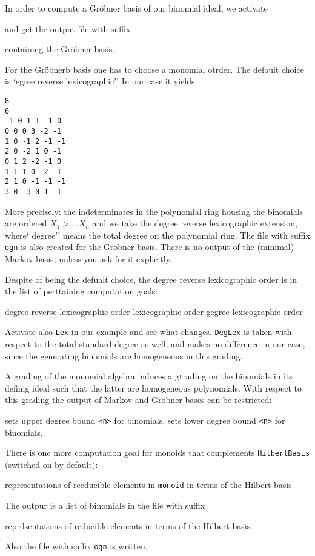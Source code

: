 In order to compute a Gröbner basis of our binomial ideal, we activate
\begin{itemize}
	\itemtt[GroebnerBasis]
\end{itemize}
and get the output file with suffix
\begin{itemize}
	\itemtt[grb] containing the Gröbner basis.
\end{itemize}
For the Gröbnerb basis one has to choose a monomial otrder. The default choice is `egree reverse lexicographic'' In our case it yields
\begin{Verbatim}
8
6
-1 0 1 1 -1 0 
0 0 0 3 -2 -1 
1 0 -1 2 -1 -1 
2 0 -2 1 0 -1 
0 1 2 -2 -1 0 
1 1 1 0 -2 -1 
2 1 0 -1 -1 -1 
3 0 -3 0 1 -1 
\end{Verbatim}
More precisely: the indeterminates in the polynomial ring housing the binomials are ordered $X_1 > \dots X_n$ and we take the degree reverse lexicographic extension, where`  degree'' means the total degree on the polynomial ring. The file with suffix \verb|ogn| is also created for the Gröbner basis. There is no output of the (minimal) Markov basis, unless you ask for it explicitly. 

Despite of being the defualt choice, the degree reverse lexicographic order is in the list of perttaining computation goals:
\begin{itemize}
	\itemtt[RevLex] degree reverse lexicographic order
	\itemtt[Lex] lexicographic order
	\itemtt[DegLex] gegree lexicographic order 
\end{itemize}
Activate also \verb|Lex| in our example and see what changes. \verb|DegLex| is taken with respect to the total standard degree as well, and makes no difference in our case, since the generating binomials are homogeneous in this grading.

A grading of the monomial algebra induces a gtrading on the binomials in its definig ideal such that the latter are homogeneous polynomials. With respect to this grading  the output of Markov and Gröbner bases can be restricted:
\begin{itemize}
	 sets upper degree bound \verb|<n>| for binomials,
	 sets lower degree bound  \verb|<n>| for binomials. 
\end{itemize}

There is one more computation goal for monoids that complements \verb|HilbertBasis| (switched on by default):
\begin{itemize}
	\itemtt[Representations] representations of reeducible elements in \verb|monoid| in terms of the Hilbert basis
\end{itemize}
The outpur is a list of binomials in the file with suffix
\begin{itemize}
	\itemtt[rep] reprdsentations of reducible elements in terms of the Hilbert basis.
\end{itemize}
Also the file with suffix \verb|ogn| is written.

